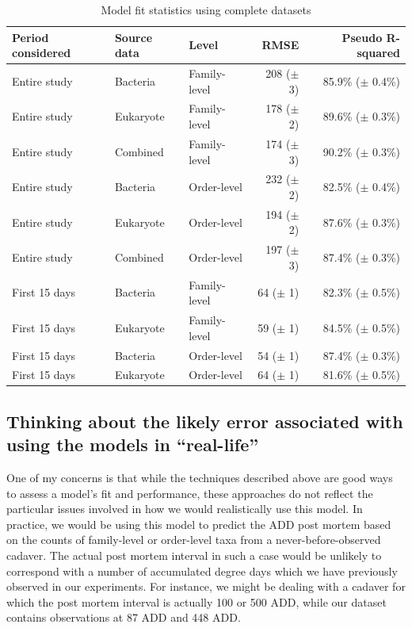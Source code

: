 \documentclass{article}
\begin{document}
\begin{table}
  \centering
\caption{\label{tbl:final_model_stats}Model fit statistics using
  complete datasets}
\begin{tabular}{lllrr}
Period considered & Source data & Level & RMSE & Pseudo R-squared\\ \hline \hline
Entire study & Bacteria  & Family-level & 208 ($\pm$ 3) & 85.9\% ($\pm$ 0.4\%)\\
Entire study & Eukaryote & Family-level & 178 ($\pm$ 2) & 89.6\% ($\pm$ 0.3\%)\\
Entire study & Combined  & Family-level & 174 ($\pm$ 3) & 90.2\% ($\pm$ 0.3\%)\\ \hline
Entire study & Bacteria  & Order-level & 232 ($\pm$ 2) & 82.5\% ($\pm$ 0.4\%)\\
Entire study & Eukaryote & Order-level & 194 ($\pm$ 2) & 87.6\% ($\pm$ 0.3\%)\\
Entire study & Combined  & Order-level & 197 ($\pm$ 3) & 87.4\% ($\pm$ 0.3\%)\\ \hline
First 15 days & Bacteria  & Family-level &  64 ($\pm$ 1) & 82.3\% ($\pm$ 0.5\%)\\
First 15 days & Eukaryote & Family-level &  59 ($\pm$ 1) & 84.5\% ($\pm$ 0.5\%)\\ \hline
First 15 days & Bacteria  & Order-level  &  54 ($\pm$ 1) & 87.4\% ($\pm$ 0.3\%)\\
First 15 days & Eukaryote & Order-level  &  64 ($\pm$ 1) & 81.6\% ($\pm$ 0.5\%)
\end{tabular}
\end{table}


\subsection{Thinking about the likely error associated with using the models in ``real-life''}

One of my concerns is that while the techniques described above are
good ways to assess a model's fit and performance, these approaches do
not reflect the particular issues involved in how we would
realistically use this model.  In practice, we would be using this
model to predict the ADD post mortem based on the counts of
family-level or order-level taxa from a never-before-observed cadaver.
The actual post mortem interval in such a case would be unlikely to
correspond with a number of accumulated degree days which we have
previously observed in our experiments.  For instance, we might be
dealing with a cadaver for which the post mortem interval is actually
100 or 500 ADD, while our dataset contains observations at 87 ADD and
448 ADD.
\end{document}

